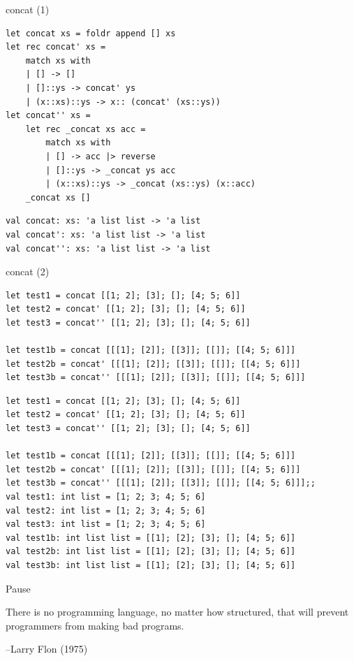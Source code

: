 \documentclass[t]{beamer}
\begin{document}
\begin{frame}[label={sec:org43e90ff},fragile]{concat (1)}
 \begin{verbatim}
let concat xs = foldr append [] xs
let rec concat' xs = 
    match xs with
    | [] -> []
    | []::ys -> concat' ys
    | (x::xs)::ys -> x:: (concat' (xs::ys))
let concat'' xs =
    let rec _concat xs acc = 
        match xs with
        | [] -> acc |> reverse
        | []::ys -> _concat ys acc
        | (x::xs)::ys -> _concat (xs::ys) (x::acc)
    _concat xs []
\end{verbatim}

\begin{verbatim}
val concat: xs: 'a list list -> 'a list
val concat': xs: 'a list list -> 'a list
val concat'': xs: 'a list list -> 'a list
\end{verbatim}
\end{frame}

\begin{frame}[label={sec:org916229e},fragile]{concat (2)}
 \begin{verbatim}
let test1 = concat [[1; 2]; [3]; []; [4; 5; 6]]
let test2 = concat' [[1; 2]; [3]; []; [4; 5; 6]]
let test3 = concat'' [[1; 2]; [3]; []; [4; 5; 6]]

let test1b = concat [[[1]; [2]]; [[3]]; [[]]; [[4; 5; 6]]]
let test2b = concat' [[[1]; [2]]; [[3]]; [[]]; [[4; 5; 6]]] 
let test3b = concat'' [[[1]; [2]]; [[3]]; [[]]; [[4; 5; 6]]] 
\end{verbatim}

\begin{verbatim}
let test1 = concat [[1; 2]; [3]; []; [4; 5; 6]]
let test2 = concat' [[1; 2]; [3]; []; [4; 5; 6]]
let test3 = concat'' [[1; 2]; [3]; []; [4; 5; 6]]

let test1b = concat [[[1]; [2]]; [[3]]; [[]]; [[4; 5; 6]]]
let test2b = concat' [[[1]; [2]]; [[3]]; [[]]; [[4; 5; 6]]] 
let test3b = concat'' [[[1]; [2]]; [[3]]; [[]]; [[4; 5; 6]]];;
val test1: int list = [1; 2; 3; 4; 5; 6]
val test2: int list = [1; 2; 3; 4; 5; 6]
val test3: int list = [1; 2; 3; 4; 5; 6]
val test1b: int list list = [[1]; [2]; [3]; []; [4; 5; 6]]
val test2b: int list list = [[1]; [2]; [3]; []; [4; 5; 6]]
val test3b: int list list = [[1]; [2]; [3]; []; [4; 5; 6]]
\end{verbatim}
\end{frame}

\begin{frame}[label={sec:org593f83c}]{Pause}
\begin{block}{}
There is no programming language, no matter how structured, 
that will prevent programmers from making bad programs.

\null\hfill--Larry Flon (1975)
\end{block}
\end{frame}
\end{document}
